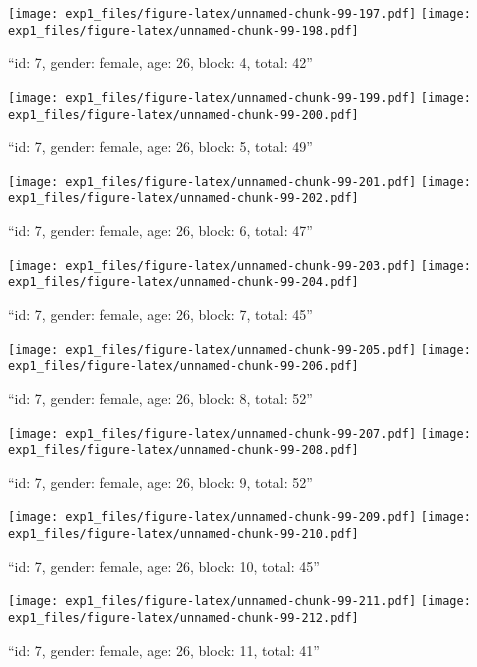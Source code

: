 \documentclass[,]{article}
\begin{document}
\texttt{[image: exp1\_files/figure-latex/unnamed-chunk-99-197.pdf]}
\texttt{[image: exp1\_files/figure-latex/unnamed-chunk-99-198.pdf]}

\newpage
[1] 

``id: 7, gender: female, age: 26, block: 4, total: 42''

\texttt{[image: exp1\_files/figure-latex/unnamed-chunk-99-199.pdf]}
\texttt{[image: exp1\_files/figure-latex/unnamed-chunk-99-200.pdf]}

\newpage
[1] 

``id: 7, gender: female, age: 26, block: 5, total: 49''

\texttt{[image: exp1\_files/figure-latex/unnamed-chunk-99-201.pdf]}
\texttt{[image: exp1\_files/figure-latex/unnamed-chunk-99-202.pdf]}

\newpage
[1] 

``id: 7, gender: female, age: 26, block: 6, total: 47''

\texttt{[image: exp1\_files/figure-latex/unnamed-chunk-99-203.pdf]}
\texttt{[image: exp1\_files/figure-latex/unnamed-chunk-99-204.pdf]}

\newpage
[1] 

``id: 7, gender: female, age: 26, block: 7, total: 45''

\texttt{[image: exp1\_files/figure-latex/unnamed-chunk-99-205.pdf]}
\texttt{[image: exp1\_files/figure-latex/unnamed-chunk-99-206.pdf]}

\newpage
[1] 

``id: 7, gender: female, age: 26, block: 8, total: 52''

\texttt{[image: exp1\_files/figure-latex/unnamed-chunk-99-207.pdf]}
\texttt{[image: exp1\_files/figure-latex/unnamed-chunk-99-208.pdf]}

\newpage
[1] 

``id: 7, gender: female, age: 26, block: 9, total: 52''

\texttt{[image: exp1\_files/figure-latex/unnamed-chunk-99-209.pdf]}
\texttt{[image: exp1\_files/figure-latex/unnamed-chunk-99-210.pdf]}

\newpage
[1] 

``id: 7, gender: female, age: 26, block: 10, total: 45''

\texttt{[image: exp1\_files/figure-latex/unnamed-chunk-99-211.pdf]}
\texttt{[image: exp1\_files/figure-latex/unnamed-chunk-99-212.pdf]}

\newpage
[1] 

``id: 7, gender: female, age: 26, block: 11, total: 41''
\end{document}
